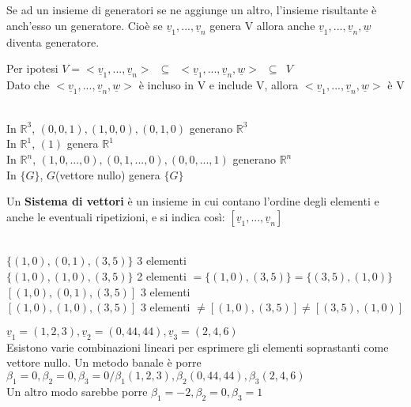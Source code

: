 \begin{nota}
	Se ad un insieme di generatori se ne aggiunge un altro, l'insieme risultante è anch'esso un generatore. Cioè se $\underline{v}_1,...,\underline{v}_n$ genera V allora anche $\underline{v}_1,...,\underline{v}_n,\underline{w}$ diventa generatore.
	\begin{dimostrazione}
		Per ipotesi $V=<\underline{v}_1,...,\underline{v}_n>\phantom{1}\subseteq\phantom{1}<\underline{v}_1,...,\underline{v}_n,\underline{w}>\phantom{1}\subseteq\phantom{1} V$\\
		Dato che $<\underline{v}_1,...,\underline{v}_n,\underline{w}>$ è incluso in V e include V, allora $<\underline{v}_1,...,\underline{v}_n,\underline{w}>$ è V\\
		\begin{es}
			\phantom{}\\
			In $\mathbb{R}^3$, $(0,0,1),(1,0,0),(0,1,0)$ generano $\mathbb{R}^3$\\
			In $\mathbb{R}^1$, $(1)$ genera $\mathbb{R}^1$\\
			In $\mathbb{R}^n$, $(1,0,...,0),(0,1,...,0),(0,0,...,1)$ generano $\mathbb{R}^n$\\
			In $\{G\}$, $G$(vettore nullo) genera $\{G\}$ 
		\end{es}
	\end{dimostrazione}
\end{nota}

Un \textbf{Sistema di vettori} è un insieme in cui contano l'ordine degli elementi e anche le eventuali ripetizioni, e si indica così: $[\underline{v}_1,...,\underline{v}_n]$
\begin{es}
	\phantom{}\\
	$\{(1,0),(0,1),(3,5)\}$ 3 elementi\\
	$\{(1,0),(1,0),(3,5)\}$ 2 elementi $=\{(1,0),(3,5)\}=\{(3,5),(1,0)\}$\\
	$[(1,0),(0,1),(3,5)]$ 3 elementi\\
	$[(1,0),(1,0),(3,5)]$ 3 elementi $\neq[(1,0),(3,5)]\neq[(3,5),(1,0)]$ 
\end{es}
\begin{nota}
$\underline{v}_1=(1,2,3),\underline{v}_2=(0,44,44),\underline{v}_3=(2,4,6)$\\
Esistono varie combinazioni lineari per esprimere gli elementi soprastanti come vettore nullo. Un metodo banale è porre $\beta_1=0,\beta_2=0,\beta_3=0/\beta_1(1,2,3),\beta_2(0,44,44),\beta_3(2,4,6)$\\
Un altro modo sarebbe porre $\beta_1=-2,\beta_2=0,\beta_3=1$
\end{nota}

